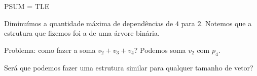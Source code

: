\begin{frame}{PSUM = TLE}
    
    \begin{center}
    \end{center}

    Diminuímos a quantidade máxima de dependências de $4$ para $2$. Notemos que a estrutura que fizemos foi a de uma árvore binária.

    Problema: como fazer a soma $v_2+v_3+v_4$? Podemos soma $v_2$ com $p_4$.

    Será que podemos fazer uma estrutura similar para qualquer tamanho de vetor?


\end{frame}
